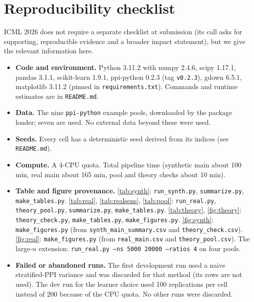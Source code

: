 \section{Reproducibility checklist}
\label{app:checklist}

ICML 2026 does not require a separate checklist at submission (its call asks for supporting, reproducible evidence and a broader impact statement), but we give the relevant information here.

\begin{itemize}
  \item \textbf{Code and environment.} Python 3.11.2 with numpy 2.4.6, scipy 1.17.1, pandas 3.1.1, scikit-learn 1.9.1, ppi-python 0.2.3 (tag \texttt{v0.2.3}), gdown 6.5.1, matplotlib 3.11.2 (pinned in \texttt{requirements.txt}). Commands and runtime estimates are in \texttt{README.md}.
  \item \textbf{Data.} The nine \texttt{ppi-python} example pools, downloaded by the package loader; seven are used. No external data beyond these were used.
  \item \textbf{Seeds.} Every cell has a deterministic seed derived from its indices (see \texttt{README.md}).
  \item \textbf{Compute.} A 4-CPU quota. Total pipeline time \TOTALTIME{} (synthetic main about 100 min, real main about 165 min, pool and theory checks about 10 min).
  \item \textbf{Table and figure provenance.} \cref{tab:synth}: \texttt{run\_synth.py}, \texttt{summarize.py}, \texttt{make\_tables.py}. \cref{tab:real}, \cref{tab:realsens}, \cref{tab:pool}: \texttt{run\_real.py}, \texttt{theory\_pool.py}, \texttt{summarize.py}, \texttt{make\_tables.py}. \cref{tab:theory}, \cref{fig:theory}: \texttt{theory\_check.py}, \texttt{make\_tables.py}, \texttt{make\_figures.py}. \cref{fig:synth}: \texttt{make\_figures.py} (from \texttt{synth\_main\_summary.csv} and \texttt{theory\_check.csv}). \cref{fig:real}: \texttt{make\_figures.py} (from \texttt{real\_main.csv} and \texttt{theory\_pool.csv}). The large-$n$ extension: \texttt{run\_real.py --ns 5000 20000 --ratios 4} on four pools.
  \item \textbf{Failed or abandoned runs.} The first development run used a naive stratified-PPI variance and was discarded for that method (its rows are not used). The dev run for the learner choice used 100 replications per cell instead of 200 because of the CPU quota. No other runs were discarded.
\end{itemize}

